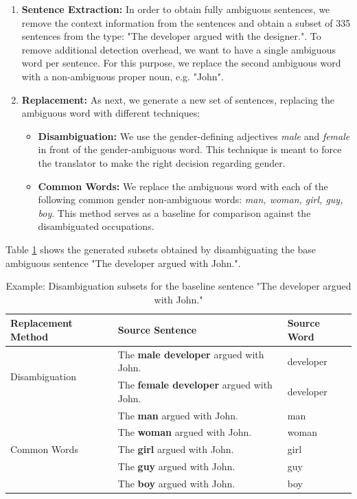 \begin{enumerate}
  \item \textbf{Sentence Extraction:}  
  In order to obtain fully ambiguous sentences, we remove the context information from the sentences and obtain a subset of 335 sentences from the type: "The developer argued with the designer.".
  To remove additional detection overhead, we want to have a single ambiguous word per sentence. For this purpose, we replace the second ambiguous word with a non-ambiguous proper noun, e.g. "John". 
  \item \textbf{Replacement:} 
  As next, we generate a new set of sentences, replacing the ambiguous word with different techniques:
  \begin{itemize}
      \item \textbf{Disambiguation:} We use the gender-defining adjectives \textit{male} and \textit{female} in front of the gender-ambiguous word. This technique is meant to force the translator to make the right decision regarding gender. %
      \item \textbf{Common Words:} We replace the ambiguous word with each of the following common gender non-ambiguous words: \textit{man, woman, girl, guy, boy}. This method serves as a baseline for comparison against the disambiguated occupations.
  \end{itemize}
\end{enumerate}

Table \ref{tab:preprocessing} shows the generated subsets obtained by disambiguating the base ambiguous sentence "The developer argued with John.".

\begin{table}[!htb]
    \begin{tabularx}{\linewidth}{|l|X|l|}
        \hline
        \textbf{Replacement Method} & \textbf{Source Sentence} & \textbf{Source Word} \\ \hline
        \multirow{2}{*}{Disambiguation} & The \textbf{male developer} argued with John. & developer \\
        & The \textbf{female developer} argued with John. & developer \\ \hline
        \multirow{5}{*}{Common Words} & The \textbf{man} argued with John. & man \\
        & The \textbf{woman} argued with John. & woman \\
        & The \textbf{girl} argued with John. & girl \\
        & The \textbf{guy} argued with John. & guy \\
        & The \textbf{boy} argued with John. & boy \\ \hline
    \end{tabularx}
    \caption{Example: Disambiguation subsets for the baseline sentence "The developer argued with John."}
    \label{tab:preprocessing}
\end{table}

